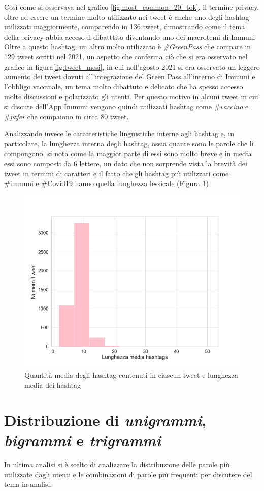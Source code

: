 Così come si osservava nel grafico \ref{fig:most_common_20_tok}, il termine privacy, oltre ad essere un termine molto utilizzato nei tweet è anche uno degli hashtag utilizzati maggiormente, comparendo in 136 tweet, dimostrando come il tema della privacy abbia acceso il dibatttito diventando uno dei macrotemi di Immuni
Oltre a questo hashtag, un altro molto utilizzato è \textit{\#GreenPass} che compare in 129 tweet scritti nel 2021, un aspetto che conferma ciò che si era osservato nel grafico in figura\ref{fig:tweet_mesi}, in cui nell'agosto 2021 si era osservato un leggero aumento dei tweet dovuti all'integrazione del Green Pass all'interno di Immuni e l'obbligo vaccinale, un tema molto dibattuto e delicato che ha spesso accesso molte discussioni e polarizzato gli utenti. Per questo motivo in alcuni tweet in cui si discute dell'App Immuni vengono quindi utilizzati hashtag come \#\textit{vaccino} e \#\textit{pzfer} che compaiono in circa 80 tweet.


Analizzando invece le caratteristiche linguistiche interne agli hashtag e, in particolare, la lunghezza interna degli hashtag, ossia quante sono le parole che li compongono, si nota come la maggior parte di essi sono molto breve e in media essi sono composti da 6 lettere, un dato che non sorprende vista la brevità dei tweet in termini di caratteri e il fatto che gli hashtag più utilizzati come \#immuni e \#Covid19 hanno quella lunghezza lessicale (Figura \ref{fig: lungh_media_hash_tweet})  
\begin{figure}[H]
    \centering
    \includegraphics[width=.6
    \textwidth]{img/lunghezza_media_hasht_tweet.png}
    \caption{Quantità media degli hashtag contenuti in ciascun tweet e lunghezza media dei hashtag}
    \label{fig: lungh_media_hash_tweet}
\end{figure}

\section{Distribuzione di \textit{unigrammi}, \textit{bigrammi} e \textit{trigrammi}}
In ultima analisi si è scelto di analizzare la distribuzione delle parole più utilizzate dagli utenti e le combinazioni di parole più frequenti per discutere del tema in analisi.

